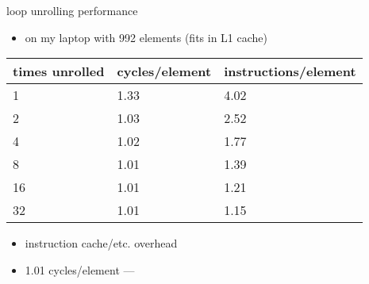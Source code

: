 \begin{frame}{loop unrolling performance}
    \begin{itemize}
        \item on my laptop with 992 elements (fits in L1 cache)
    \end{itemize}
    \begin{tabular}{lll}
        times unrolled & cycles/element & instructions/element\\ \hline
        1              & 1.33 & 4.02 \\
        2              & 1.03 & 2.52 \\
        4              & 1.02 & 1.77 \\
        8              & 1.01 & 1.39 \\
        16             & 1.01 & 1.21 \\
        32             & 1.01 & 1.15 \\
    \end{tabular}
    \begin{itemize}
        \item instruction cache/etc. overhead
        \item 1.01 cycles/element --- 
    \end{itemize}
\end{frame}
